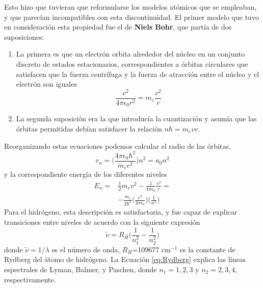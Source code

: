 Esto hizo que tuvieran que reformularse los modelos atómicos que 
se empleaban, y que parecían incompatibles con esta discontinuidad.
El primer modelo que tuvo en consideración esta propiedad fue
el de \textbf{Niels Bohr}, que partía de dos suposiciones: 
\begin{enumerate}
    \item La primera es que un electrón orbita alrededor del
    núcleo en un conjunto discreto de estados estacionarios, 
    correspondientes a órbitas circulares que satisfacen que la
    fuerza centrífuga y la fuerza de atracción entre el núcleo y el
    electrón son iguales
    \begin{equation}
        \frac{e^2}{4\pi \epsilon_0 r^2}=m_e\frac{v^2}{r}
    \end{equation}
    \item La segunda suposición era la que introducía la cuantización
    y asumía que las órbitas permitidas debían satisfacer la relación
    $n\hbar=m_evr$.
\end{enumerate}
Reorganizando estas ecuaciones podemos calcular el radio de las órbitas,
\begin{equation}
    r_n=\bigg(\frac{4\pi \epsilon_0\hbar^2}{m_ee^2}\bigg)n^2=a_0n^2    
\end{equation}
y la correspondiente energía de los diferentes niveles
\begin{equation}
    \begin{split}
    E_n= & \frac{1}{2}m_ev^2 - \frac{1}{4\pi \epsilon_0}\frac{e^2}{r}=\\
    & -\frac{m_e}{2\hbar^2}\bigg(\frac{e^2}{4\pi\epsilon_0}\bigg)\bigg(\frac{1}{n^2}\bigg)
    \end{split}
\end{equation}
Para el hidrógeno, esta descripción es satisfactoria, y fue capaz de
explicar transiciones entre niveles de acuerdo con la siguiente 
expresión
\begin{equation}
    \tilde{\nu}=R_H\bigg(\frac{1}{n^2_1} -\frac{1}{n^2_2}\bigg) 
    \label{eq:Rydberg}
\end{equation}
donde $\tilde{\nu}=1/\lambda$ es el número de onda, $R_H$=109677 cm$^{-1}$ 
es la constante de Rydberg del átomo de hidrógeno. La Ecuación 
\ref{eq:Rydberg} explica las líneas espectrales de Lyman, Balmer, 
y Paschen, donde $n_1=1,2, 3$ y $n_2=2,3,4$, respectivamente.
